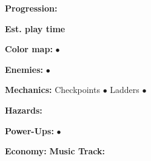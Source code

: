 \documentclass[12pt]{article}
\begin{document}
\begin{multicols}{2}
\begin{addmargin}[5mm]{0em}
\textbf{Progression:} 
\end{addmargin}
\indent\indent \textbf{Est. play time}
\begin{addmargin}[5mm]{0em}
\textbf{Color map:} $\bullet$
\end{addmargin}
\begin{addmargin}[5mm]{0em}
\textbf{Enemies:} $\bullet$
\end{addmargin}
\begin{addmargin}[5mm]{0em}
\textbf{Mechanics:} Checkpoints $\bullet$ Ladders $\bullet$
\end{addmargin}
\begin{addmargin}[5mm]{0em}
\textbf{Hazards:} 
\end{addmargin}
\begin{addmargin}[5mm]{0em}
\textbf{Power-Ups:} $\bullet$
\end{addmargin}
\indent\indent \textbf{Economy:}  \newline
\indent \textbf{Music Track:} 
\end{multicols}
\newpage
\end{document}
